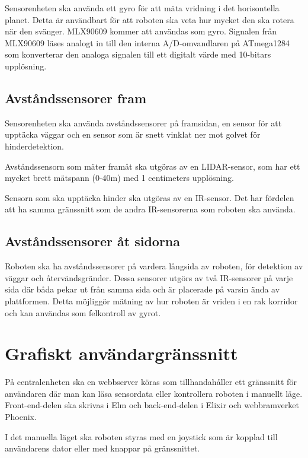 \documentclass[a4paper,titlepage,12pt]{article}
\begin{document}
	Sensorenheten ska använda ett gyro för att mäta vridning i det horisontella
	planet. Detta är användbart för att roboten ska veta hur mycket
	den ska rotera när den svänger. MLX90609 kommer att användas som gyro. Signalen från 
	MLX90609 läses analogt in till den interna A/D-omvandlaren på ATmega1284 som konverterar 
	den analoga signalen till ett digitalt värde med 10-bitars upplösning. 
	
	\subsection{Avståndssensorer fram}
	
	Sensorenheten ska använda avståndssensorer på framsidan, en sensor för att
	upptäcka väggar och en sensor som är snett vinklat ner mot golvet för hinderdetektion. 

	Avståndssensorn som mäter framåt ska utgöras av en LIDAR-sensor, som har
    ett mycket brett mätspann (0-40m) med 1 centimeters upplösning.

	Sensorn som ska upptäcka hinder ska utgöras av en IR-sensor. Det
	har fördelen att ha samma gränssnitt som de andra IR-sensorerna som roboten
	ska använda.

	\subsection{Avståndssensorer åt sidorna}
	Roboten ska ha avståndssensorer på vardera långsida av roboten, för
	detektion av väggar och återvändsgränder. Dessa sensorer utgörs av två 
    IR-sensorer på varje sida där båda pekar ut från samma sida och
	är placerade på varsin ända av plattformen. Detta möjliggör mätning av hur
	roboten är vriden i en rak korridor och kan användas som felkontroll av
	gyrot.
	
	\section{Grafiskt användargränssnitt}
	På centralenheten ska en webbserver köras som tillhandahåller ett gränssnitt
	för användaren där man kan läsa sensordata eller kontrollera roboten i
	manuellt läge. Front-end-delen ska skrivas i Elm och back-end-delen i Elixir
    och webbramverket Phoenix.

	I det manuella läget ska roboten styras med en joystick som är kopplad till användarens
	dator eller med knappar på gränssnittet.
	
\end{document}
